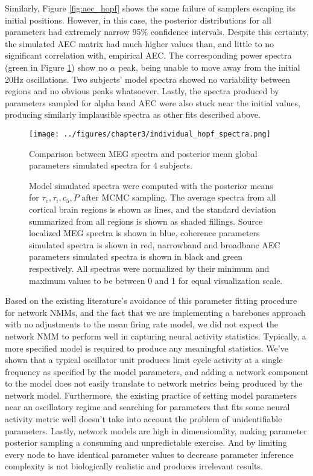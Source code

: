 Similarly, Figure \ref{fig:aec_hopf} shows the same failure of samplers escaping its initial positions. However, in this case, the posterior distributions for all parameters had extremely narrow 95\% confidence intervals. Despite this certainty, the simulated AEC matrix had much higher values than, and little to no significant correlation with, empirical AEC. The corresponding power spectra (green in Figure \ref{fig:psd_hopf}) show no $\alpha$ peak, being unable to move away from the initial 20Hz oscillations. Two subjects' model spectra showed no variability between regions and no obvious peaks whatsoever. Lastly, the spectra produced by parameters sampled for alpha band AEC were also stuck near the initial values, producing similarly implausible spectra as other fits described above. 

\begin{figure}[htbp]
    \centering
    \texttt{[image: ../figures/chapter3/individual\_hopf\_spectra.png]}
   \caption{Comparison between MEG spectra and posterior mean global parameters simulated spectra for 4 subjects.}
    \caption*{Model simulated spectra were computed with the posterior means for ${\tau_e, \tau_i, c_5, P}$ after MCMC sampling. The average spectra from all cortical brain regions is shown as lines, and the standard deviation summarized from all regions is shown as shaded fillings. Source localized MEG spectra is shown in blue, coherence parameters simulated spectra is shown in red, narrowband and broadbanc AEC parameters simulated spectra is shown in black and green respectively. All spectras were normalized by their minimum and maximum values to be between 0 and 1 for equal visualization scale.}
    \label{fig:psd_hopf}
\end{figure}

Based on the existing literature's avoidance of this parameter fitting procedure for network NMMs, and the fact that we are implementing a barebones approach with no adjustments to the mean firing rate model, we did not expect the network NMM to perform well in capturing neural activity statistics. Typically, a more specified model is required to produce any meaningful statistics. We've shown that a typical oscillator unit produces limit cycle activity at a single frequency as specified by the model parameters, and adding a network component to the model does not easily translate to network metrics being produced by the network model. Furthermore, the existing practice of setting model parameters near an oscillatory regime and searching for parameters that fits some neural activity metric well doesn't take into account the problem of unidentifiable parameters. Lastly, network models are high in dimensionality, making parameter posterior sampling a consuming and unpredictable exercise. And by limiting every node to have identical parameter values to decrease parameter inference complexity is not biologically realistic and produces irrelevant results. 

